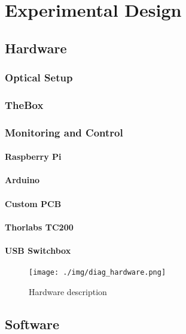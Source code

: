 \documentclass[master,       %
               twoside,        %
               BCOR10mm,       %
               ngerman,english  %
               ]{GAUBM_astro}
\begin{document}
\chapter{Experimental Design}

\section{Hardware}
\subsection{Optical Setup}
\subsection{TheBox}
\subsection{Monitoring and Control}
\subsubsection{Raspberry Pi}
\subsubsection{Arduino}
\subsubsection{Custom PCB}
\subsubsection{Thorlabs TC200}
\subsubsection{USB Switchbox}

\begin{center}
 \begin{figure}[h!]
 \centering
 \texttt{[image: ./img/diag\_hardware.png]}
 \caption{Hardware description}
 \label{fig:diag_hardware}
\end{figure}
\end{center}



\section{Software}
\end{document}
